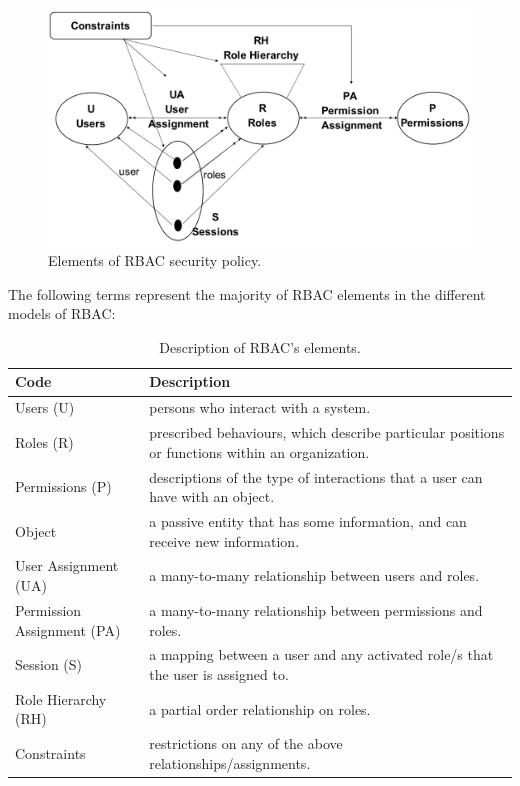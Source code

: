 \begin{figure}[bht]
\centering
\includegraphics[scale=0.26]{RBACElements.png}
\caption{Elements of RBAC security policy.}
\label{fig:elelmRBAC}
\end{figure}



The following terms represent the majority of RBAC elements in the different models of RBAC:

\begin{table}[bth]
\centering
\caption{Description of RBAC's elements.}
\small
{}
\begin{tabular}{p{1.6 in} p{5.2 in}} \hline 
\hline
Code & Description\\\hline

Users (U)&  persons who interact with a system.\\
Roles (R)& prescribed behaviours, which describe particular positions or functions within an organization. \\
Permissions (P)& descriptions of the type of interactions that a user can have with an object.\\
Object& a passive entity that has some information, and   can receive new information.\\
User Assignment (UA)&a many-to-many relationship between users and roles.\\
Permission Assignment (PA)& a many-to-many relationship between permissions and roles.\\
Session (S)& a mapping between a user and any activated role/s that the user is assigned to.\\
Role Hierarchy (RH)& a partial order relationship on roles.\\
Constraints&restrictions on any of the above relationships/assignments.  \\ \hline\hline

\end{tabular}
\label{tab:namehere}


\end{table}


